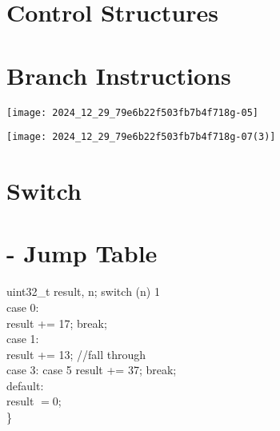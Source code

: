 \section{Control Structures}

\section*{Branch Instructions}
\begin{center}
\texttt{[image: 2024\_12\_29\_79e6b22f503fb7b4f718g-05]}
\end{center}

\begin{center}
    \texttt{[image: 2024\_12\_29\_79e6b22f503fb7b4f718g-07(3)]}
    \end{center}
    
    \section*{Switch}
    \section*{- Jump Table}
    uint32\_t result, n; switch (n) 1\\
    case 0:\\
    result += 17; break;\\
    case 1:\\
    result += 13; //fall through\\
    case 3: case 5 result += 37; break;\\
    default:\\
    result $=0$;\\
    \}
    
